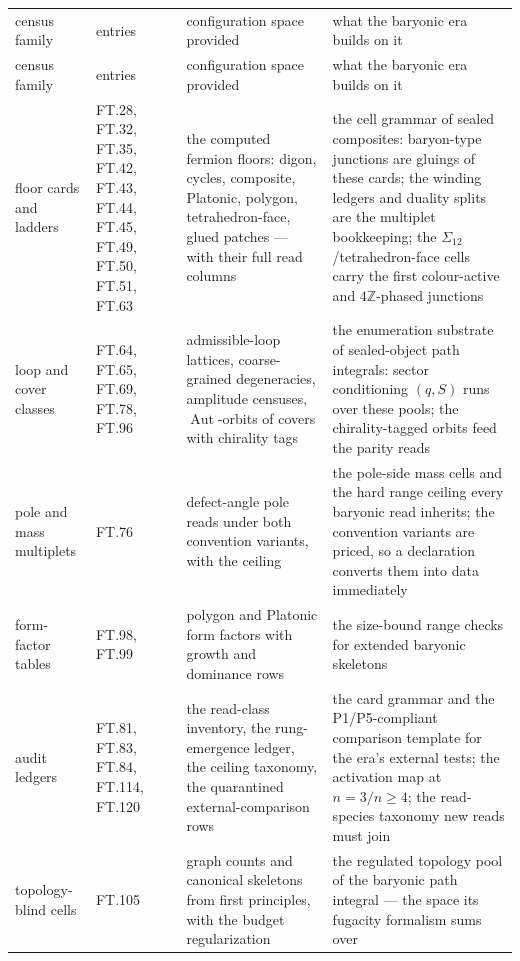 \documentclass[11pt,openany]{report}
\theoremstyle{canonplain}
\theoremstyle{canondef}
\begin{document}
{\scriptsize\setlength{\tabcolsep}{4pt}
\begin{longtable}{>{\raggedright\arraybackslash}p{}|>{\raggedright\arraybackslash}p{}|>{\raggedright\arraybackslash}p{}|>{\raggedright\arraybackslash}p{}}
\toprule
census family & entries & configuration space provided & what the baryonic era builds on it \\
\addlinespace[2pt]
\midrule
\endfirsthead
\toprule
census family & entries & configuration space provided & what the baryonic era builds on it \\
\addlinespace[2pt]
\midrule
\endhead
\bottomrule
\endlastfoot
floor cards and ladders & FT.28, FT.32, FT.35, FT.42, FT.43, FT.44, FT.45, FT.49, FT.50, FT.51, FT.63 & the computed fermion floors: digon, cycles, composite, Platonic, polygon, tetrahedron-face, glued patches — with their full read columns & the cell grammar of sealed composites: baryon-type junctions are gluings of these cards; the winding ledgers and duality splits are the multiplet bookkeeping; the $\Sigma_{12}$/tetrahedron-face cells carry the first colour-active and $4\mathbb Z$-phased junctions \\
loop and cover classes & FT.64, FT.65, FT.69, FT.78, FT.96 & admissible-loop lattices, coarse-grained degeneracies, amplitude censuses, $\operatorname{Aut}$-orbits of covers with chirality tags & the enumeration substrate of sealed-object path integrals: sector conditioning $(q,\allowbreak S)$ runs over these pools; the chirality-tagged orbits feed the parity reads \\
pole and mass multiplets & FT.76 & defect-angle pole reads under both convention variants, with the ceiling & the pole-side mass cells and the hard range ceiling every baryonic read inherits; the convention variants are priced, so a declaration converts them into data immediately \\
form-factor tables & FT.98, FT.99 & polygon and Platonic form factors with growth and dominance rows & the size-bound range checks for extended baryonic skeletons \\
audit ledgers & FT.81, FT.83, FT.84, FT.114, FT.120 & the read-class inventory, the rung-emergence ledger, the ceiling taxonomy, the quarantined external-comparison rows & the card grammar and the P1/P5-compliant comparison template for the era's external tests; the activation map at $n=\allowbreak 3/n\ge\allowbreak 4$; the read-species taxonomy new reads must join \\
topology-blind cells & FT.105 & graph counts and canonical skeletons from first principles, with the budget regularization & the regulated topology pool of the baryonic path integral — the space its fugacity formalism sums over \\
\end{longtable}
}
\end{document}
